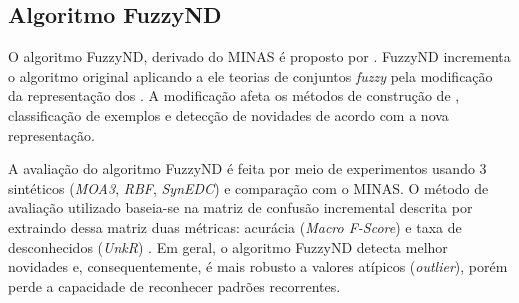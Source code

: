 \subsection{Algoritmo FuzzyND}


O algoritmo FuzzyND, derivado do MINAS é proposto por .
FuzzyND incrementa o algoritmo original aplicando a ele teorias de
conjuntos \emph{fuzzy} pela modificação da representação dos \clusters.
A modificação afeta os métodos de construção de \clusters, classificação
de exemplos e detecção de novidades de acordo com a nova representação.


A avaliação do algoritmo FuzzyND é feita por meio de experimentos usando 3 
\datasets sintéticos (\emph{MOA3}, \emph{RBF}, \emph{SynEDC})
e comparação com o MINAS.
O método de avaliação utilizado baseia-se na matriz de confusão incremental
descrita por  extraindo dessa matriz duas métricas:
acurácia (\emph{Macro F-Score}) \cite{Sokolova2009} e
taxa de desconhecidos (\emph{UnkR}) \cite{Faria2016minas}.
Em geral, o algoritmo FuzzyND detecta melhor novidades e, consequentemente,
é mais robusto a valores atípicos (\emph{outlier}), porém perde a capacidade
de reconhecer padrões recorrentes.


